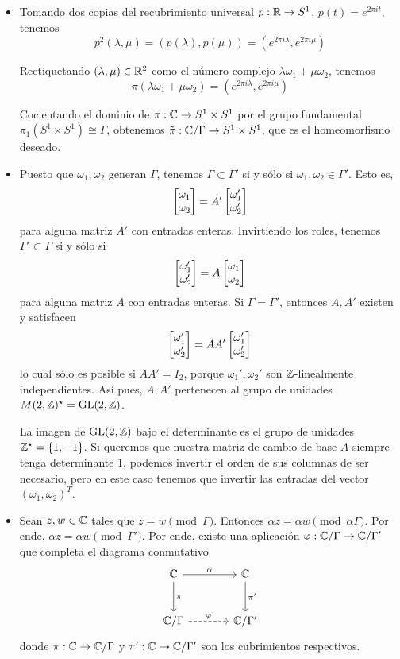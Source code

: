 \begin{solution}
\leavevmode
\begin{itemize}
    \item Tomando dos copias del recubrimiento universal $p : \mathbb R \to S^1$, $p(t) = e^{2\pi it}$, tenemos
    $$p^2(\lambda, \mu) = (p(\lambda), p(\mu)) = (e^{2\pi i\lambda}, e^{2\pi i\mu})$$
    
    Reetiquetando $(\lambda, \mu) \in \mathbb R^2$ como el número complejo $\lambda \omega_1 + \mu \omega_2$, tenemos
    $$\pi(\lambda \omega_1 + \mu \omega_2) = (e^{2\pi i\lambda}, e^{2\pi i\mu})$$
    
    Cocientando el dominio de $\pi : \mathbb C \to S^1 \times S^1$ por el grupo fundamental $\pi_1(S^1 \times S^1) \cong \Gamma$, obtenemos $\tilde \pi : \mathbb C / \Gamma \to S^1 \times S^1$, que es el homeomorfismo deseado.
    
    \item Puesto que $\omega_1, \omega_2$ generan $\Gamma$, tenemos $\Gamma \subset \Gamma'$ si y sólo si $\omega_1, \omega_2 \in \Gamma'$. Esto es,
    $$\begin{bmatrix} \omega_1 \\ \omega_2 \end{bmatrix} = A' \begin{bmatrix} \omega_1' \\ \omega_2' \end{bmatrix}$$
    para alguna matriz $A'$ con entradas enteras. Invirtiendo los roles, tenemos $\Gamma' \subset \Gamma$ si y sólo si
    $$\begin{bmatrix} \omega_1' \\ \omega_2' \end{bmatrix} = A \begin{bmatrix} \omega_1 \\ \omega_2 \end{bmatrix}$$
    para alguna matriz $A$ con entradas enteras. Si $\Gamma = \Gamma'$, entonces $A, A'$ existen y satisfacen
    $$\begin{bmatrix} \omega_1' \\ \omega_2' \end{bmatrix} = AA' \begin{bmatrix} \omega_1' \\ \omega_2' \end{bmatrix}$$
    lo cual sólo es posible si $AA' = I_2$, porque $\omega_1', \omega_2'$ son $\mathbb Z$-linealmente independientes. Así pues, $A, A'$ pertenecen al grupo de unidades $M(2, \mathbb Z)^\star = \operatorname{GL}(2, \mathbb Z)$.
    
    La imagen de $\operatorname{GL}(2, \mathbb Z)$ bajo el determinante es el grupo de unidades $\mathbb Z^\star = \{ 1, -1 \}$. Si queremos que nuestra matriz de cambio de base $A$ siempre tenga determinante $1$, podemos invertir el orden de sus columnas de ser necesario, pero en este caso tenemos que invertir las entradas del vector $(\omega_1, \omega_2)^T$.
    
    \item Sean $z, w \in \mathbb C$ tales que $z = w \pmod \Gamma$. Entonces $\alpha z = \alpha w \pmod {\alpha \Gamma}$. Por ende, $\alpha z = \alpha w \pmod {\Gamma'}$. Por ende, existe una aplicación $\varphi : \mathbb C / \Gamma \to \mathbb C / \Gamma'$ que completa el diagrama conmutativo
    $$
    \begin{tikzcd}[row sep=large, column sep=large]
        \C \arrow[r, "\alpha"] \arrow[d, "\pi"] & \C \arrow[d, "\pi'"] \\
        \C / \Gamma \arrow[r, dashed, "\varphi"] & \C / \Gamma'
    \end{tikzcd}
    $$
    donde $\pi : \mathbb C \to \mathbb C / \Gamma$ y $\pi' : \mathbb C \to \mathbb C / \Gamma'$ son los cubrimientos respectivos.
    

\end{itemize}
\end{solution}
